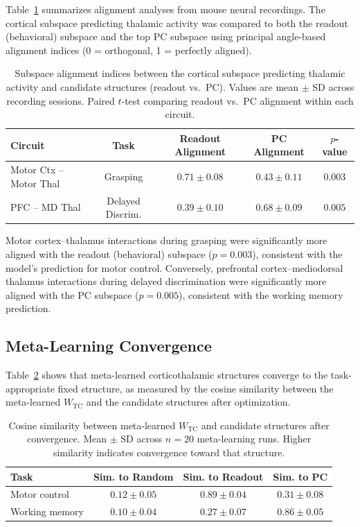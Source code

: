 \documentclass[11pt]{article}
\begin{document}
Table~\ref{tab:neural_data} summarizes alignment analyses from mouse neural recordings. The cortical subspace predicting thalamic activity was compared to both the readout (behavioral) subspace and the top PC subspace using principal angle-based alignment indices (0 = orthogonal, 1 = perfectly aligned).

\begin{table}[H]
\centering
\caption{Subspace alignment indices between the cortical subspace predicting thalamic activity and candidate structures (readout vs.\ PC). Values are mean $\pm$ SD across recording sessions. Paired $t$-test comparing readout vs.\ PC alignment within each circuit.}
\label{tab:neural_data}
\begin{tabular}{lcccc}
\toprule
Circuit & Task & Readout Alignment & PC Alignment & $p$-value \\
\midrule
Motor Ctx -- Motor Thal & Grasping & $\mathbf{0.71 \pm 0.08}$ & $0.43 \pm 0.11$ & $0.003$ \\
PFC -- MD Thal & Delayed Discrim. & $0.39 \pm 0.10$ & $\mathbf{0.68 \pm 0.09}$ & $0.005$ \\
\bottomrule
\end{tabular}
\end{table}

Motor cortex--thalamus interactions during grasping were significantly more aligned with the readout (behavioral) subspace ($p = 0.003$), consistent with the model's prediction for motor control. Conversely, prefrontal cortex--mediodorsal thalamus interactions during delayed discrimination were significantly more aligned with the PC subspace ($p = 0.005$), consistent with the working memory prediction.

\subsection{Meta-Learning Convergence}

Table~\ref{tab:meta_convergence} shows that meta-learned corticothalamic structures converge to the task-appropriate fixed structure, as measured by the cosine similarity between the meta-learned $W_{\text{TC}}$ and the candidate structures after optimization.

\begin{table}[H]
\centering
\caption{Cosine similarity between meta-learned $W_{\text{TC}}$ and candidate structures after convergence. Mean $\pm$ SD across $n = 20$ meta-learning runs. Higher similarity indicates convergence toward that structure.}
\label{tab:meta_convergence}
\begin{tabular}{lccc}
\toprule
Task & Sim. to Random & Sim. to Readout & Sim. to PC \\
\midrule
Motor control & $0.12 \pm 0.05$ & $\mathbf{0.89 \pm 0.04}$ & $0.31 \pm 0.08$ \\
Working memory & $0.10 \pm 0.04$ & $0.27 \pm 0.07$ & $\mathbf{0.86 \pm 0.05}$ \\
\bottomrule
\end{tabular}
\end{table}
\end{document}
